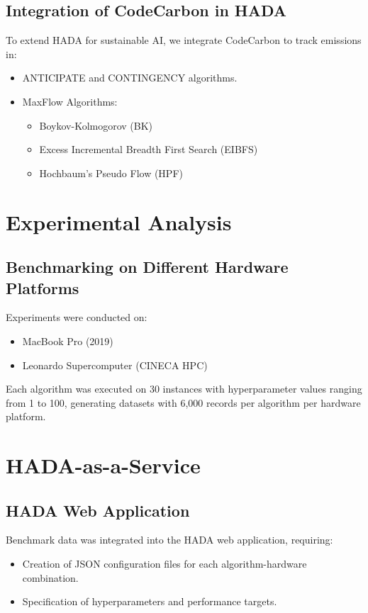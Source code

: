 \documentclass[a4paper,singleside,12pt]{report} %
\begin{document}
\section{Integration of CodeCarbon in HADA}

To extend HADA for sustainable AI, we integrate CodeCarbon to track emissions in:
\begin{itemize}
\item ANTICIPATE and CONTINGENCY algorithms.
\item MaxFlow Algorithms:
\begin{itemize}
\item Boykov-Kolmogorov (BK)
\item Excess Incremental Breadth First Search (EIBFS)
\item Hochbaum's Pseudo Flow (HPF)
\end{itemize}
\end{itemize}

\chapter{Experimental Analysis}

\section{Benchmarking on Different Hardware Platforms}
Experiments were conducted on:
\begin{itemize}
\item MacBook Pro (2019)
\item Leonardo Supercomputer (CINECA HPC)
\end{itemize}

Each algorithm was executed on 30 instances with hyperparameter values ranging from 1 to 100, 
generating datasets with 6,000 records per algorithm per hardware platform.

\chapter{HADA-as-a-Service}

\section{HADA Web Application}
Benchmark data was integrated into the HADA web application, requiring:
\begin{itemize}
\item Creation of JSON configuration files for each algorithm-hardware combination.
\item Specification of hyperparameters and performance targets.
\end{itemize}
\end{document}
